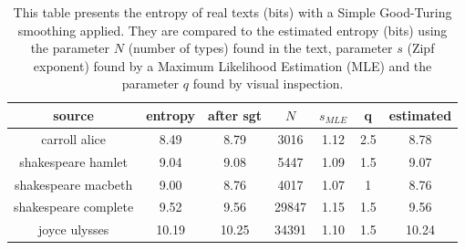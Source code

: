 %
%
%
%



\begin{table}[h!]
\centering
\caption{This table presents the entropy of real texts (bits) with a Simple Good-Turing smoothing applied. They are compared to the estimated entropy (bits) using the parameter $N$ (number of types) found in the text, parameter $s$ (Zipf exponent) found by a Maximum Likelihood Estimation (MLE) and the parameter $q$ found by visual inspection.}
\label{tab:entropytexts2}
\begin{tabular}{| c | c | c | c | c | c | c |}
  \hline
  source & entropy & after sgt & $N$ & $s_{MLE}$ & q & estimated \\
  \hline
  carroll alice        & 8.49  & 8.79  & 3016  & 1.12 & 2.5 & 8.78  \\
  shakespeare hamlet   & 9.04  & 9.08  & 5447  & 1.09 & 1.5 & 9.07  \\
  shakespeare macbeth  & 9.00  & 8.76  & 4017  & 1.07 & 1   & 8.76  \\
  shakespeare complete & 9.52  & 9.56  & 29847 & 1.15 & 1.5 & 9.56  \\
  joyce ulysses        & 10.19 & 10.25 & 34391 & 1.10 & 1.5 & 10.24 \\
  \hline
\end{tabular}
\end{table}



